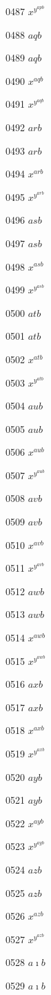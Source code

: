 \documentclass{article}
\begin{document}
0487 $x^{y^{apb}}$\par
0488 $aqb$\par
0489 $\displaystyle aqb$\par
0490 $x^{aqb}$\par
0491 $x^{y^{aqb}}$\par
0492 $arb$\par
0493 $\displaystyle arb$\par
0494 $x^{arb}$\par
0495 $x^{y^{arb}}$\par
0496 $asb$\par
0497 $\displaystyle asb$\par
0498 $x^{asb}$\par
0499 $x^{y^{asb}}$\par
0500 $atb$\par
0501 $\displaystyle atb$\par
0502 $x^{atb}$\par
0503 $x^{y^{atb}}$\par
0504 $aub$\par
0505 $\displaystyle aub$\par
0506 $x^{aub}$\par
0507 $x^{y^{aub}}$\par
0508 $avb$\par
0509 $\displaystyle avb$\par
0510 $x^{avb}$\par
0511 $x^{y^{avb}}$\par
0512 $awb$\par
0513 $\displaystyle awb$\par
0514 $x^{awb}$\par
0515 $x^{y^{awb}}$\par
0516 $axb$\par
0517 $\displaystyle axb$\par
0518 $x^{axb}$\par
0519 $x^{y^{axb}}$\par
0520 $ayb$\par
0521 $\displaystyle ayb$\par
0522 $x^{ayb}$\par
0523 $x^{y^{ayb}}$\par
0524 $azb$\par
0525 $\displaystyle azb$\par
0526 $x^{azb}$\par
0527 $x^{y^{azb}}$\par
0528 $a\imath b$\par
0529 $\displaystyle a\imath b$\par
\end{document}

